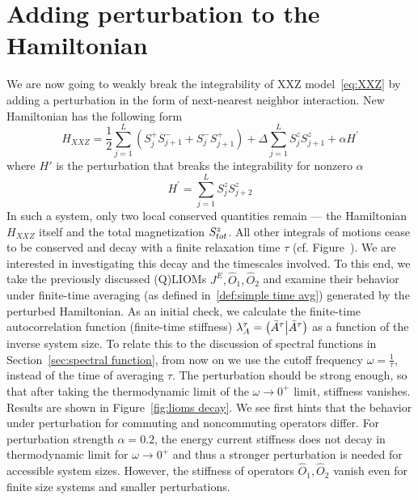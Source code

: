 \section{Adding perturbation to the Hamiltonian}
We are now going to weakly break the integrability of XXZ model~\eqref{eq:XXZ} 
by adding a perturbation in the form of next-nearest neighbor interaction.
New Hamiltonian has the following form
\begin{equation}
    H_{XXZ} = \frac{1}{2}\sum_{j = 1}^{L}\left( S^{+}_{j} S^{-}_{j+1} + 
    S^{-}_{j}S^{+}_{j+1} \right) + \Delta\sum_{j = 1}^{L} S^{z}_{j}S^{z}_{j+1}
    + \alpha H^{\prime}
    \label{eq:HXXZ perturbed}
\end{equation}
where \(H'\) is the perturbation that breaks the integrability for nonzero \(\alpha \)
\begin{equation}
    H^{\prime}=\sum_{j = 1}^{L} S^{z}_{j}S^{z}_{j+2}
    \label{eq:perturbation}
\end{equation}
In such a system, only two local conserved quantities remain --- the Hamiltonian \(H_{XXZ}\) itself 
and the total magnetization \(S^{z}_{tot}\). All other integrals of motions cease to be conserved
and decay with a finite relaxation time \(\tau\) (cf. Figure~).
We are interested in investigating this decay and the timescales involved.
To this end, we take the previously discussed (Q)LIOMs \(J^E, \hat{O}_1,\hat{O}_2\)
and examine their behavior under finite-time averaging 
(as defined in~\eqref{def:simple time avg}) generated by the perturbed Hamiltonian.
As an initial check, we calculate the finite-time autocorrelation function (finite-time stiffness)
\(\lambda^{\tau}_A = \left(\bar{A}^{\tau} \middle| \bar{A}^{\tau}\right)\) as a function of the inverse system size.
To relate this to the discussion of spectral functions in Section~\ref{sec:spectral function},
from now on we use the cutoff frequency \(\omega = \frac{1}{\tau}\), instead of the time of
averaging \(\tau\). The perturbation should be strong enough, so that after taking the thermodynamic limit
of the \(\omega \to 0^+\) limit, stiffness vanishes. Results are shown in Figure~\ref{fig:lioms decay}.
We see first hints that the behavior under perturbation for commuting and noncommuting operators
differ. For perturbation strength \(\alpha=0.2\), the energy current stiffness does
not decay in thermodynamic limit for \(\omega \to 0^+\) and thus a stronger perturbation is needed for accessible system sizes.
However, the stiffness of operators \(\hat{O}_1,\hat{O}_2\) vanish even for finite size systems
and smaller perturbations. 
